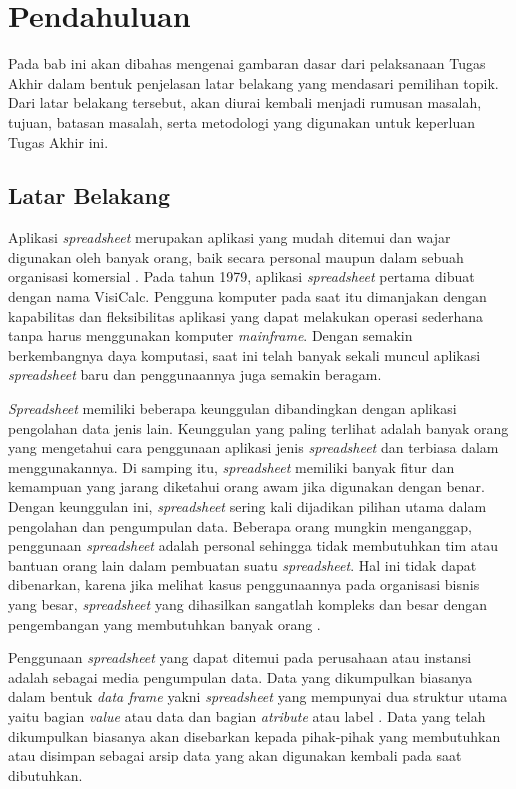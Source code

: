 \chapter{Pendahuluan}

Pada bab ini akan dibahas mengenai gambaran dasar dari pelaksanaan Tugas Akhir dalam bentuk penjelasan latar belakang yang mendasari pemilihan topik. Dari latar belakang tersebut, akan diurai kembali menjadi rumusan masalah, tujuan, batasan masalah, serta metodologi yang digunakan untuk keperluan Tugas Akhir ini.

\section{Latar Belakang}

Aplikasi \textit{spreadsheet} merupakan aplikasi yang mudah ditemui dan wajar digunakan oleh banyak orang, baik secara personal maupun dalam sebuah organisasi komersial \citep{Chan1996}. Pada tahun 1979, aplikasi \textit{spreadsheet} pertama dibuat dengan nama VisiCalc. Pengguna komputer pada saat itu dimanjakan dengan kapabilitas dan fleksibilitas aplikasi yang dapat melakukan operasi sederhana tanpa harus menggunakan komputer \textit{mainframe}. Dengan semakin berkembangnya daya komputasi, saat ini telah banyak sekali muncul aplikasi \textit{spreadsheet} baru dan penggunaannya juga semakin beragam.

\textit{Spreadsheet} memiliki beberapa keunggulan dibandingkan dengan aplikasi pengolahan data jenis lain. Keunggulan yang paling terlihat adalah banyak orang yang mengetahui cara penggunaan aplikasi jenis \textit{spreadsheet} dan terbiasa dalam menggunakannya. Di samping itu, \textit{spreadsheet} memiliki banyak fitur dan kemampuan yang jarang diketahui orang awam jika digunakan dengan benar. Dengan keunggulan ini, \textit{spreadsheet} sering kali dijadikan pilihan utama dalam pengolahan dan pengumpulan data. Beberapa orang mungkin menganggap, penggunaan \textit{spreadsheet} adalah personal sehingga tidak membutuhkan tim atau bantuan orang lain dalam pembuatan suatu \textit{spreadsheet}. Hal ini tidak dapat dibenarkan, karena jika melihat kasus penggunaannya pada organisasi bisnis yang besar, \textit{spreadsheet} yang dihasilkan sangatlah kompleks dan besar dengan pengembangan yang membutuhkan banyak orang \citep{Panko1998}. 

Penggunaan \textit{spreadsheet} yang dapat ditemui pada perusahaan atau instansi adalah sebagai media pengumpulan data. Data yang dikumpulkan biasanya dalam bentuk \textit{data frame} yakni \textit{spreadsheet} yang mempunyai dua struktur utama yaitu bagian \textit{value} atau data dan bagian \textit{atribute} atau label \citep{Chen2013}. Data yang telah dikumpulkan biasanya akan disebarkan kepada pihak-pihak yang membutuhkan atau disimpan sebagai arsip data yang akan digunakan kembali pada saat dibutuhkan.

